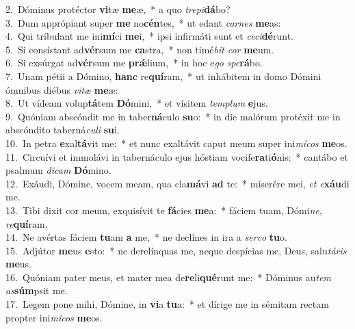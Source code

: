 {2.~}Dóminus protéctor \textbf{vi}tæ \textbf{me}æ,~* a quo \textit{tre}\textit{pi}\textbf{dá}bo?\\
{3.~}Dum apprópiant super \textbf{me} no\textbf{cén}tes,~* ut edant \textit{car}\textit{nes} \textbf{me}as:\\
{4.~}Qui tríbulant me ini\textbf{mí}ci \textbf{me}i,~* ipsi infirmáti sunt et \textit{ce}\textit{ci}\textbf{dé}runt.\\
{5.~}Si consístant ad\textbf{vér}sum me \textbf{ca}stra,~* non timé\textit{bit} \textit{cor} \textbf{me}um.\\
{6.~}Si exsúrgat ad\textbf{vér}sum me \textbf{prǽ}lium,~* in hoc e\textit{go} \textit{spe}\textbf{rá}bo.\\
{7.~}Unam pétii a Dómino, \textbf{hanc} re\textbf{quí}ram,~* ut inhábitem in domo Dómini ómnibus diébus \textit{vi}\textit{tæ} \textbf{me}æ:\\
{8.~}Ut vídeam volup\textbf{tá}tem \textbf{Dó}mini,~* et vísitem \textit{tem}\textit{plum} \textbf{e}jus.\\
{9.~}Quóniam abscóndit me in taber\textbf{ná}culo \textbf{su}o:~* in die malórum protéxit me in abscóndito taberná\textit{cu}\textit{li} \textbf{su}i.\\
{10.~}In petra \textbf{e}xal\textbf{tá}vit me:~* et nunc exaltávit caput meum super ini\textit{mí}\textit{cos} \textbf{me}os.\\
{11.~}Circuívi et immolávi in tabernáculo ejus hóstiam vocife\textbf{ra}ti\textbf{ó}nis:~* cantábo et psalmum \textit{di}\textit{cam} \textbf{Dó}mino.\\
{12.~}Exáudi, Dómine, vocem meam, qua cla\textbf{má}vi \textbf{ad} te:~* miserére mei, \textit{et} \textit{e}\textbf{xáu}di me.\\
{13.~}Tibi dixit cor meum, exquisívit te \textbf{fá}cies \textbf{me}a:~* fáciem tuam, Dómi\textit{ne}, \textit{re}\textbf{quí}ram.\\
{14.~}Ne avértas fáciem \textbf{tu}am \textbf{a} me,~* ne declínes in ira a \textit{ser}\textit{vo} \textbf{tu}o.\\
{15.~}Adjútor \textbf{me}us \textbf{e}sto:~* ne derelínquas me, neque despícias me, Deus, salu\textit{tá}\textit{ris} \textbf{me}us.\\
{16.~}Quóniam pater meus, et mater mea de\textbf{re}li\textbf{qué}runt me:~* Dóminus au\textit{tem} \textit{as}\textbf{súm}psit me.\\
{17.~}Legem pone mihi, Dómine, in \textbf{vi}a \textbf{tu}a:~* et dírige me in sémitam rectam propter ini\textit{mí}\textit{cos} \textbf{me}os.\\

